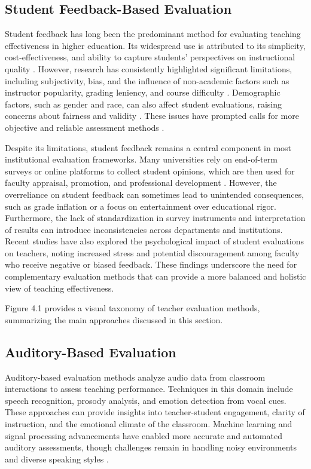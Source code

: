 
\subsection{Student Feedback-Based Evaluation}
Student feedback has long been the predominant method for evaluating teaching effectiveness in higher education. Its widespread use is attributed to its simplicity, cost-effectiveness, and ability to capture students' perspectives on instructional quality \cite{Ajmal2024, Husain2016}. However, research has consistently highlighted significant limitations, including subjectivity, bias, and the influence of non-academic factors such as instructor popularity, grading leniency, and course difficulty \cite{Heffernan2022, carvalho2022biases}. Demographic factors, such as gender and race, can also affect student evaluations, raising concerns about fairness and validity \cite{Steinberg2021}. These issues have prompted calls for more objective and reliable assessment methods \cite{Ginsburg2022NecessaryBI}.

Despite its limitations, student feedback remains a central component in most institutional evaluation frameworks. Many universities rely on end-of-term surveys or online platforms to collect student opinions, which are then used for faculty appraisal, promotion, and professional development \cite{8615171}. However, the overreliance on student feedback can sometimes lead to unintended consequences, such as grade inflation or a focus on entertainment over educational rigor. Furthermore, the lack of standardization in survey instruments and interpretation of results can introduce inconsistencies across departments and institutions. Recent studies have also explored the psychological impact of student evaluations on teachers, noting increased stress and potential discouragement among faculty who receive negative or biased feedback. These findings underscore the need for complementary evaluation methods that can provide a more balanced and holistic view of teaching effectiveness.

Figure 4.1 provides a visual taxonomy of teacher evaluation methods, summarizing the main approaches discussed in this section.

\subsection{Auditory-Based Evaluation}
Auditory-based evaluation methods analyze audio data from classroom interactions to assess teaching performance. Techniques in this domain include speech recognition, prosody analysis, and emotion detection from vocal cues. These approaches can provide insights into teacher-student engagement, clarity of instruction, and the emotional climate of the classroom. Machine learning and signal processing advancements have enabled more accurate and automated auditory assessments, though challenges remain in handling noisy environments and diverse speaking styles \cite{Wang2022, Yang2022}.

